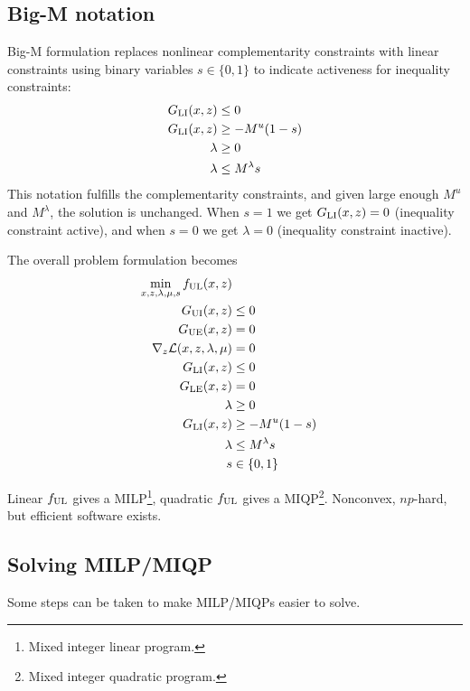 \subsection{Big-M notation}
Big-M formulation replaces nonlinear complementarity constraints with linear constraints using binary variables $s \in \{0,1\}$ to indicate activeness for inequality constraints:
%
\begin{equation}\label{eq:big-M}
  \begin{split}
    G_\mathrm{LI}(x,z) &\leq 0 \\
    G_\mathrm{LI}(x,z) &\geq -M^u(1-s) \\
    \lambda        &\geq 0 \\
    \lambda        &\leq M^\lambda s
  \end{split}
\end{equation}
%
This notation fulfills the complementarity constraints, and given large enough $M^u$ and $M^\lambda$, the solution is unchanged. When $s = 1$ we get $G_\mathrm{LI}(x,z) = 0$ (inequality constraint active), and when $s = 0$ we get $\lambda = 0$ (inequality constraint inactive).

The overall problem formulation becomes
%
\begin{equation}
  \begin{split}
    \min_{x,z,\lambda,\mu,s} f_\mathrm{UL}(x,z) \\
    G_\mathrm{UI}(x,z) & \leq 0 \\
    G_\mathrm{UE}(x,z) &= 0 \\
    \nabla_z \mathcal{L}(x,z,\lambda,\mu) &= 0 \\
    G_\mathrm{LI}(x,z) &\leq 0 \\
    G_\mathrm{LE}(x,z) &= 0 \\
    \lambda &\geq 0 \\
    G_\mathrm{LI}(x,z) &\geq -M^u(1-s) \\
    \lambda &\leq M^\lambda s \\
    s &\in \{0,1\}
  \end{split}
\end{equation}

Linear $f_\mathrm{UL}$ gives a MILP\footnote{Mixed integer linear program.}, quadratic $f_\mathrm{UL}$ gives a MIQP\footnote{Mixed integer quadratic program.}. Nonconvex, $np$-hard, but efficient software exists.

\subsection{Solving MILP/MIQP}
Some steps can be taken to make MILP/MIQPs easier to solve.

